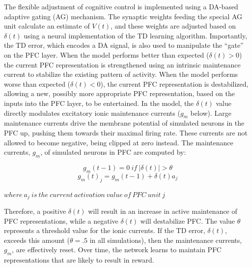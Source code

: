 \documentclass[man]{apa}
\begin{document}
The flexible adjustment of cognitive control is implemented using a
DA-based adaptive gating (AG) mechanism.  The synaptic weights feeding
the special AG unit calculate an estimate of $V(t)$, and these weights
are adjusted based on $\delta(t)$ using a neural implementation of the
TD learning algorithm.  Importantly, the TD error, which encodes a DA
signal, is also used to manipulate the ``gate'' on the PFC layer.
When the model performs better than expected ($\delta(t) > 0$) the
current PFC representation is strengthened using an intrinsic
maintenance current to stabilize the existing pattern of activity.
When the model performs worse than expected ($\delta(t) < 0$), the
current PFC representation is destabilized, allowing a new, possibly
more appropriate PFC representation, based on the inputs into the PFC
layer, to be entertained.  In the model, the \begin{math}\delta(t)\end{math} value directly modulates excitatory ionic maintenance currents (\begin{math}g_m\end{math} below).  Large maintenance currents drive the membrane potential of simulated neurons in the PFC up, pushing them towards their maximal firing rate.  These currents are not allowed to become negative, being clipped at zero instead.  The maintenance currents, $g_m$, of simulated neurons in PFC are computed by:

\begin{equation}g_m(t-1) = 0 ~if~ |\delta(t)| > \theta\end{equation}
\begin{equation}g_m(t)_j = g_m(t-1) + \delta(t) a_j\end{equation}
\begin{center}$where~a_j~is~the~current~activation~value~of~PFC~unit~j$\end{center}

Therefore, a positive \begin{math}\delta(t)\end{math} will result in an increase in active maintenance of PFC representations, while a negative \begin{math}\delta(t)\end{math} will destabilize PFC.  The value \begin{math}\theta\end{math} represents a threshold value for the ionic currents.  If the TD error, \begin{math}\delta(t)\end{math}, exceeds this amount (\begin{math}\theta = .5\end{math} in all simulations), then the maintenance currents, \begin{math}g_m\end{math}, are effectively reset.  Over time, the network learns to maintain PFC representations that are likely to result in reward.  
\end{document}
